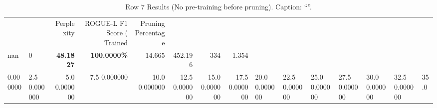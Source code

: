 \begin{table}
\caption{Row 7 Results (No pre-training before pruning). \ifshowcaption{}Caption: ``''.\fi}
\label{tab:evaluation-pipeline-7-untrained}
\begin{tabular}{llrrrrrr}
 &  & Perplexity & ROGUE-L F1 Score (%
Trained & Pruning Percentage &  &  &  &  &  &  \\
nan & 0 & \bfseries 48.1827 & \bfseries 100.0000\% & 14.665 & 452.196 & 334 & 1.354 \\
0.000000 & 2.5%
0.000000 & 5.0%
0.000000 & 7.5%
0.000000 & 10.0%
0.000000 & 12.5%
0.000000 & 15.0%
0.000000 & 17.5%
0.000000 & 20.0%
0.000000 & 22.5%
0.000000 & 25.0%
0.000000 & 27.5%
0.000000 & 30.0%
0.000000 & 32.5%
0.000000 & 35.0%

\end{tabular}
\end{table}
